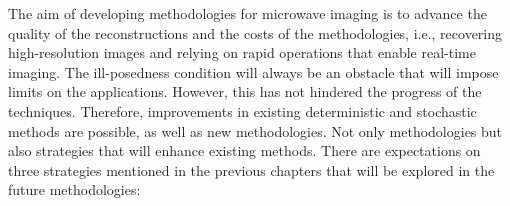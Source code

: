 		The aim of developing methodologies for microwave imaging is to advance the quality of the reconstructions and the costs of the methodologies, i.e., recovering high-resolution images and relying on rapid operations that enable real-time imaging. The ill-posedness condition will always be an obstacle that will impose limits on the applications. However, this has not hindered the progress of the techniques. Therefore, improvements in existing deterministic and stochastic methods are possible, as well as new methodologies. Not only methodologies but also strategies that will enhance existing methods. There are expectations on three strategies mentioned in the previous chapters that will be explored in the future methodologies:
		

